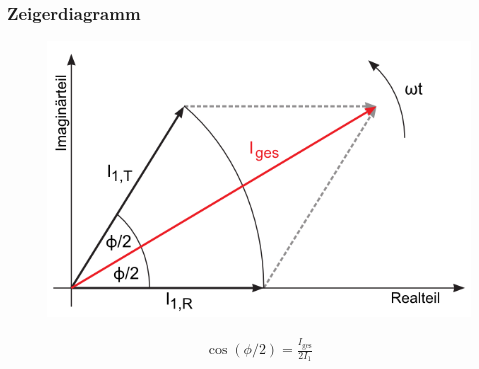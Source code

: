 \documentclass[12pt,a4paper,titlepage,headinclude,bibtotoc]{scrartcl}
\begin{document}
\subsubsection{Zeigerdiagramm}
\begin{figure}[!htb]
	\centering
	\includegraphics[scale=0.8]{Zeigerdiagramm.png}
\end{figure}
\begin{align}
	\cos(\phi/2)=\frac{I_\text{ges}}{2I_1}
	\label{eq:zeigerdiagramm}
\end{align}
\end{document}
